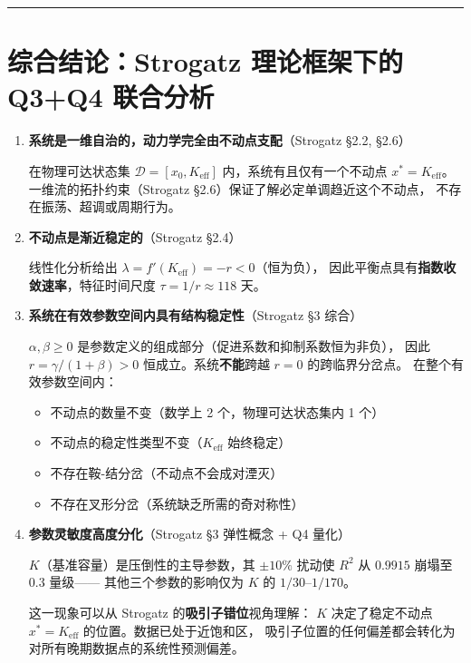 \documentclass[12pt,a4paper]{article}
\begin{document}
\vspace{12pt}
\hrule
\vspace{12pt}

\section{综合结论：Strogatz 理论框架下的 Q3+Q4 联合分析}

\begin{enumerate}[label=\textbf{\arabic*.}]

\item \textbf{系统是一维自治的，动力学完全由不动点支配}（Strogatz \S2.2, \S2.6）

在物理可达状态集 $\mathcal{D} = [x_0, K_{\text{eff}}]$ 内，系统有且仅有一个不动点 $x^* = K_{\text{eff}}$。
一维流的拓扑约束（Strogatz \S2.6）保证了解必定单调趋近这个不动点，
不存在振荡、超调或周期行为。

\item \textbf{不动点是渐近稳定的}（Strogatz \S2.4）

线性化分析给出 $\lambda = f'(K_{\text{eff}}) = -r < 0$（恒为负），
因此平衡点具有\textbf{指数收敛速率}，特征时间尺度 $\tau = 1/r \approx 118$ 天。

\item \textbf{系统在有效参数空间内具有结构稳定性}（Strogatz \S3 综合）

$\alpha, \beta \geq 0$ 是参数定义的组成部分（促进系数和抑制系数恒为非负），
因此 $r = \gamma/(1+\beta) > 0$ 恒成立。系统\textbf{不能}跨越 $r = 0$ 的跨临界分岔点。
在整个有效参数空间内：
\begin{itemize}
  \item 不动点的数量不变（数学上 2 个，物理可达状态集内 1 个）
  \item 不动点的稳定性类型不变（$K_{\text{eff}}$ 始终稳定）
  \item 不存在鞍-结分岔（不动点不会成对湮灭）
  \item 不存在叉形分岔（系统缺乏所需的奇对称性）
\end{itemize}

\item \textbf{参数灵敏度高度分化}（Strogatz \S3 弹性概念 + Q4 量化）

$K$（基准容量）是压倒性的主导参数，其 $\pm 10\%$ 扰动使 $R^2$ 从 $0.9915$ 崩塌至 $0.3$ 量级——
其他三个参数的影响仅为 $K$ 的 $1/30$--$1/170$。

这一现象可以从 Strogatz 的\textbf{吸引子错位}视角理解：
$K$ 决定了稳定不动点 $x^* = K_{\text{eff}}$ 的位置。数据已处于近饱和区，
吸引子位置的任何偏差都会转化为对所有晚期数据点的系统性预测偏差。


\end{enumerate}
\end{document}
